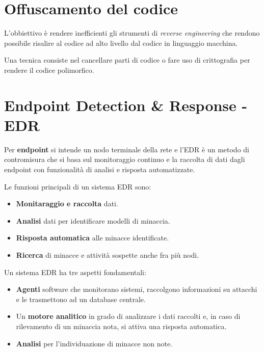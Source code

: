 \section{Offuscamento del codice}
L'obbiettivo è rendere inefficienti gli strumenti di \emph{reverse engineering} che rendono possibile risalire al
codice ad alto livello dal codice in linguaggio macchina.

Una tecnica consiste nel cancellare parti di codice o fare uso di crittografia per rendere il codice polimorfico.

\section{Endpoint Detection \& Response - EDR}
Per \textbf{endpoint} si intende un nodo terminale della rete e l'EDR è un metodo di contromisura che si basa sul
monitoraggio continuo e la raccolta di dati dagli endpoint con funzionalità di analisi e risposta automatizzate.

Le funzioni principali di un sistema EDR sono:
\begin{itemize}
	\item \textbf{Monitaraggio e raccolta} dati.
	\item \textbf{Analisi} dati per identificare modelli di minaccia.
	\item \textbf{Risposta automatica} alle minacce identificate.
	\item \textbf{Ricerca} di minacce e attività sospette anche fra più nodi.
\end{itemize}
Un sistema EDR ha tre aspetti fondamentali:
\begin{itemize}
	\item \textbf{Agenti} software che monitorano sistemi, raccolgono informazioni su attacchi e le trasmettono ad un
	      database centrale.
	\item Un \textbf{motore analitico} in grado di analizzare i dati raccolti e, in caso di rilevamento di un minaccia
	      nota, si attiva una risposta automatica.
	\item \textbf{Analisi} per l'individuazione di minacce non note.
\end{itemize}
